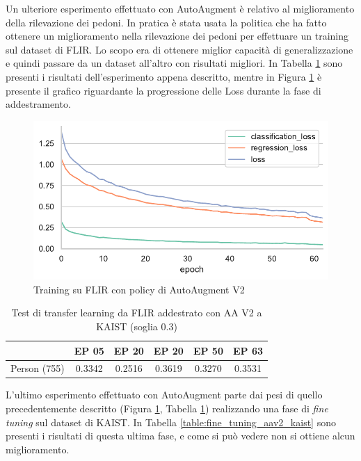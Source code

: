 Un ulteriore esperimento effettuato con AutoAugment è relativo al miglioramento della rilevazione dei pedoni. In pratica è stata usata la politica che ha fatto ottenere un miglioramento nella rilevazione dei pedoni per effettuare un training sul dataset di FLIR. Lo scopo era di ottenere miglior capacità di generalizzazione e quindi passare da un dataset all'altro con risultati migliori. In Tabella \ref{table:tl_flir_kaist_aav2} sono presenti i risultati dell'esperimento appena descritto, mentre in Figura \ref{fig:AA_v2} è presente il grafico riguardante la progressione delle Loss durante la fase di addestramento. 
\begin{figure}[]
    \centering
    \includegraphics[width=\textwidth]{images/graphic/train_aa_flir_v2.pdf}
    \caption{Training su FLIR con policy di AutoAugment V2}
    \label{fig:AA_v2}
\end{figure}

\begin{table}[]
    \begin{tabular}{c|c|c|c|c|c|}
    \cline{2-6}
     & EP 05 & EP 20 & EP 20 & EP 50 & EP 63 \\ \hline
    \multicolumn{1}{|c|}{Person (755)} & 0.3342 & 0.2516 & 0.3619 & 0.3270 & 0.3531 \\ \hline
    \end{tabular}
    \caption{Test di transfer learning da FLIR addestrato con AA V2 a KAIST (soglia 0.3)}
    \label{table:tl_flir_kaist_aav2}
\end{table}

L'ultimo esperimento effettuato con AutoAugment parte dai pesi di quello precedentemente descritto (Figura \ref{fig:AA_v2}, Tabella \ref{table:tl_flir_kaist_aav2}) realizzando una fase di \textit{fine tuning} sul dataset di KAIST. In Tabella \ref{table:fine_tuning_aav2_kaist} sono presenti i risultati di questa ultima fase, e come si può vedere non si ottiene alcun miglioramento. 

